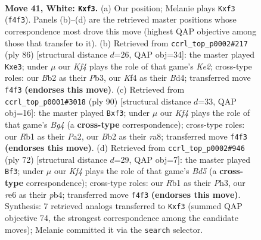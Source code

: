 \documentclass[11pt]{article}
\begin{document}
\clearpage

\begin{figure}[p]\centering
\begin{subfigure}{0.46\textwidth}\centering
\resizebox{\linewidth}{!}{%
\newchessgame
\chessboard[
  setfen={8/3n1k2/4r3/8/p1p2K2/P1P2pPp/1BP4P/1R6 w - - 0 41},
  showmover=false,
  pgfstyle=straightmove, color=movearrow, markmove={f4-f3}
]}
\caption{}
\end{subfigure}\hfill
\begin{subfigure}{0.46\textwidth}\centering
\resizebox{\linewidth}{!}{%
\newchessgame
\chessboard[
  setfen={2r1k3/5p2/8/3pPP1p/3B3P/1P2p1P1/1P2K3/8 w - - 3 44},
  showmover=false,
  pgfstyle=straightmove, color=movearrow, markmove={e2-e3}
]}
\caption{}
\end{subfigure}
\\[4pt]
\begin{subfigure}{0.46\textwidth}\centering
\resizebox{\linewidth}{!}{%
\newchessgame
\chessboard[
  setfen={r7/8/1pPp1k2/3P2p1/PK4B1/5p1P/P7/8 w - - 0 46},
  showmover=false,
  pgfstyle=straightmove, color=movearrow, markmove={g4-f3}
]}
\caption{}
\end{subfigure}\hfill
\begin{subfigure}{0.46\textwidth}\centering
\resizebox{\linewidth}{!}{%
\newchessgame
\chessboard[
  setfen={8/2b1kp2/p6p/3B4/Pp3p2/1P5P/4KPP1/8 w - - 0 37},
  showmover=false,
  pgfstyle=straightmove, color=movearrow, markmove={d5-f3}
]}
\caption{}
\end{subfigure}
\caption{\textbf{Move 41, White: \texttt{Kxf3}.} (a) Our position; Melanie plays \texttt{Kxf3} (\texttt{f4f3}). Panels (b)--(d) are the retrieved master positions whose correspondence most drove this move (highest QAP objective among those that transfer to it). (b) Retrieved from \texttt{ccrl\_top\_p0002\#217} (ply 86) [structural distance $d$=26, QAP obj=34]: the master played \texttt{Kxe3}; under $\mu$ our \emph{Kf4} plays the role of that game's \emph{Ke2}; cross-type roles: our \emph{B}b2 as their \emph{P}b3, our \emph{K}f4 as their \emph{B}d4; transferred move \texttt{f4f3} \textbf{(endorses this move)}. (c) Retrieved from \texttt{ccrl\_top\_p0001\#3018} (ply 90) [structural distance $d$=33, QAP obj=16]: the master played \texttt{Bxf3}; under $\mu$ our \emph{Kf4} plays the role of that game's \emph{Bg4} (a \textbf{cross-type} correspondence); cross-type roles: our \emph{R}b1 as their \emph{P}a2, our \emph{B}b2 as their \emph{r}a8; transferred move \texttt{f4f3} \textbf{(endorses this move)}. (d) Retrieved from \texttt{ccrl\_top\_p0002\#946} (ply 72) [structural distance $d$=29, QAP obj=7]: the master played \texttt{Bf3}; under $\mu$ our \emph{Kf4} plays the role of that game's \emph{Bd5} (a \textbf{cross-type} correspondence); cross-type roles: our \emph{R}b1 as their \emph{P}h3, our \emph{r}e6 as their \emph{p}b4; transferred move \texttt{f4f3} \textbf{(endorses this move)}. Synthesis: 7 retrieved analogs transferred to \texttt{Kxf3} (summed QAP objective 74, the strongest correspondence among the candidate moves); Melanie committed it via the \texttt{search} selector.}
\label{fig:thought-m80}
\end{figure}
\end{document}

